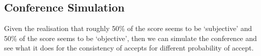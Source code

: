 \hypertarget{conference-simulation}{%
\subsection{Conference Simulation}\label{conference-simulation}}

\begin{flushright}
\end{flushright}

Given the realisation that roughly 50\% of the score seems to be
`subjective' and 50\% of the score seems to be `objective', then we can
simulate the conference and see what it does for the consistency of
accepts for different probability of accept.

\begin{Shaded}
\begin{Highlighting}[]
\end{Highlighting}
\end{Shaded}

\begin{Shaded}
\begin{Highlighting}[]
\OperatorTok{=} 
\OperatorTok{=} 
\end{Highlighting}
\end{Shaded}

